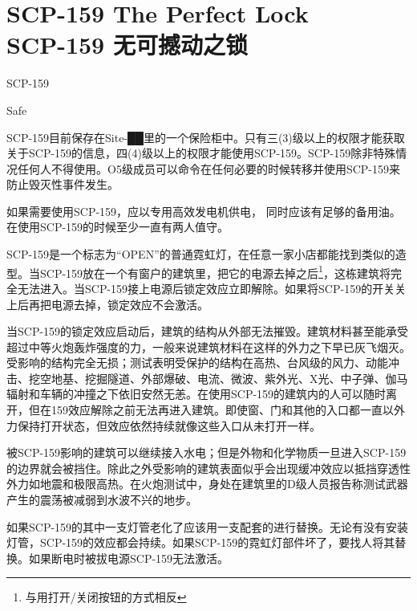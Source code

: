 \chapter[SCP-159 无可撼动之锁]{
    SCP-159 The Perfect Lock\\
    SCP-159 无可撼动之锁
}

\label{chap:SCP-159}

 SCP-159

 Safe

 SCP-159目前保存在Site-██里的一个保险柜中。只有三(3)级以上的权限才能获取关于SCP-159的信息，四(4)级以上的权限才能使用SCP-159。SCP-159除非特殊情况任何人不得使用。O5级成员可以命令在任何必要的时候转移并使用SCP-159来防止毁灭性事件发生。

如果需要使用SCP-159，应以专用高效发电机供电， 同时应该有足够的备用油。在使用SCP-159的时候至少一直有两人值守。

SCP-159是一个标志为“OPEN”的普通霓虹灯，在任意一家小店都能找到类似的造型。当SCP-159放在一个有窗户的建筑里，把它的电源去掉之后\footnote{与用打开\slash 关闭按钮的方式相反}，这栋建筑将完全无法进入。当SCP-159接上电源后锁定效应立即解除。如果将SCP-159的开关关上后再把电源去掉，锁定效应不会激活。

当SCP-159的锁定效应启动后，建筑的结构从外部无法摧毁。建筑材料甚至能承受超过中等火炮轰炸强度的力，一般来说建筑材料在这样的外力之下早已灰飞烟灭。受影响的结构完全无损；测试表明受保护的结构在高热、台风级的风力、动能冲击、挖空地基、挖掘隧道、外部爆破、电流、微波、紫外光、X光、中子弹、伽马辐射和车辆的冲撞之下依旧安然无恙。在使用SCP-159的建筑内的人可以随时离开，但在159效应解除之前无法再进入建筑。即使窗、门和其他的入口都一直以外力保持打开状态，但效应依然持续就像这些入口从未打开一样。

被SCP-159影响的建筑可以继续接入水电；但是外物和化学物质一旦进入SCP-159的边界就会被挡住。除此之外受影响的建筑表面似乎会出现缓冲效应以抵挡穿透性外力如地震和极限高热。在火炮测试中，身处在建筑里的D级人员报告称测试武器产生的震荡被减弱到水波不兴的地步。

如果SCP-159的其中一支灯管老化了应该用一支配套的进行替换。无论有没有安装灯管，SCP-159的效应都会持续。如果SCP-159的霓虹灯部件坏了，要找人将其替换。如果断电时被拔电源SCP-159无法激活。
